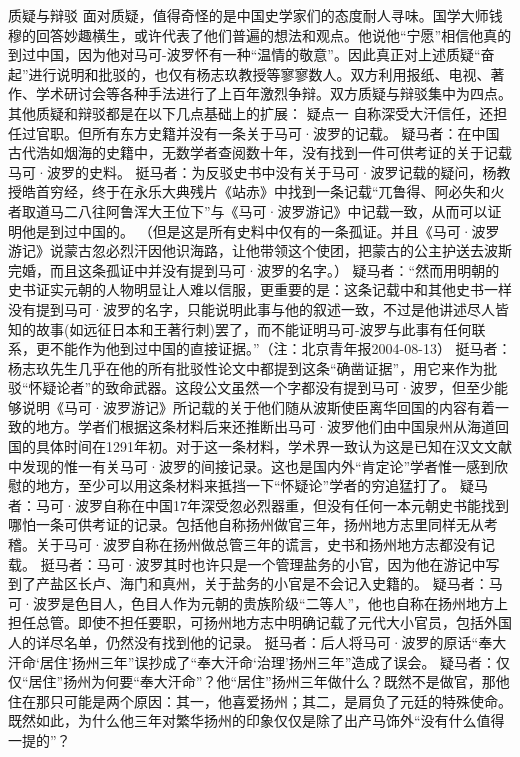 \documentclass[12pt,UTF8]{ctexbook}
\begin{document}
质疑与辩驳
面对质疑，值得奇怪的是中国史学家们的态度耐人寻味。国学大师钱穆的回答妙趣横生，或许代表了他们普遍的想法和观点。他说他“宁愿”相信他真的到过中国，因为他对马可-波罗怀有一种“温情的敬意”。因此真正对上述质疑“奋起”进行说明和批驳的，也仅有杨志玖教授等寥寥数人。双方利用报纸、电视、著作、学术研讨会等各种手法进行了上百年激烈争辩。双方质疑与辩驳集中为四点。其他质疑和辩驳都是在以下几点基础上的扩展：
疑点一
自称深受大汗信任，还担任过官职。但所有东方史籍并没有一条关于马可·波罗的记载。
疑马者：在中国古代浩如烟海的史籍中，无数学者查阅数十年，没有找到一件可供考证的关于记载马可·波罗的史料。
挺马者：为反驳史书中没有关于马可·波罗记载的疑问，杨教授皓首穷经，终于在永乐大典残片《站赤》中找到一条记载“兀鲁得、阿必失和火者取道马二八往阿鲁浑大王位下”与《马可·波罗游记》中记载一致，从而可以证明他是到过中国的。
（但是这是所有史料中仅有的一条孤证。并且《马可·波罗游记》说蒙古忽必烈汗因他识海路，让他带领这个使团，把蒙古的公主护送去波斯完婚，而且这条孤证中并没有提到马可·波罗的名字。）
疑马者：“然而用明朝的史书证实元朝的人物明显让人难以信服，更重要的是：这条记载中和其他史书一样没有提到马可·波罗的名字，只能说明此事与他的叙述一致，不过是他讲述尽人皆知的故事(如远征日本和王著行刺)罢了，而不能证明马可-波罗与此事有任何联系，更不能作为他到过中国的直接证据。”（注：北京青年报2004-08-13）
挺马者：杨志玖先生几乎在他的所有批驳性论文中都提到这条“确凿证据”，用它来作为批驳“怀疑论者”的致命武器。这段公文虽然一个字都没有提到马可·波罗，但至少能够说明《马可·波罗游记》所记载的关于他们随从波斯使臣离华回国的内容有着一致的地方。学者们根据这条材料后来还推断出马可·波罗他们由中国泉州从海道回国的具体时间在1291年初。对于这一条材料，学术界一致认为这是已知在汉文文献中发现的惟一有关马可·波罗的间接记录。这也是国内外“肯定论”学者惟一感到欣慰的地方，至少可以用这条材料来抵挡一下“怀疑论”学者的穷追猛打了。
疑马者：马可·波罗自称在中国17年深受忽必烈器重，但没有任何一本元朝史书能找到哪怕一条可供考证的记录。包括他自称扬州做官三年，扬州地方志里同样无从考稽。关于马可·波罗自称在扬州做总管三年的谎言，史书和扬州地方志都没有记载。
挺马者：马可·波罗其时也许只是一个管理盐务的小官，因为他在游记中写到了产盐区长卢、海门和真州，关于盐务的小官是不会记入史籍的。
疑马者：马可·波罗是色目人，色目人作为元朝的贵族阶级“二等人”，他也自称在扬州地方上担任总管。即使不担任要职，可扬州地方志中明确记载了元代大小官员，包括外国人的详尽名单，仍然没有找到他的记录。
挺马者：后人将马可·波罗的原话“奉大汗命‘居住’扬州三年”误抄成了“奉大汗命‘治理’扬州三年”造成了误会。
疑马者：仅仅“居住”扬州为何要“奉大汗命”？他“居住”扬州三年做什么？既然不是做官，那他住在那只可能是两个原因：其一，他喜爱扬州；其二，是肩负了元廷的特殊使命。既然如此，为什么他三年对繁华扬州的印象仅仅是除了出产马饰外“没有什么值得一提的”？
\end{document}
